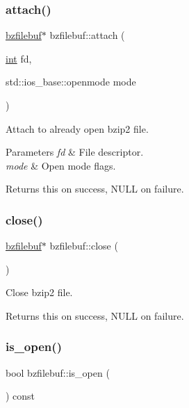 \subsubsection{\texorpdfstring{attach()}{attach()}}
{\footnotesize\ttfamily \hyperlink{classbzfilebuf}{bzfilebuf}$\ast$ bzfilebuf\+::attach (\begin{DoxyParamCaption}\item[{\hyperlink{lp__lib_8h_adeb9ec6400320e4923ac9d836d509ddb}{int}}]{fd,  }\item[{std\+::ios\+\_\+base\+::openmode}]{mode }\end{DoxyParamCaption})}



Attach to already open bzip2 file. 


\begin{DoxyParams}{Parameters}
{\em fd} & File descriptor. \\
\hline
{\em mode} & Open mode flags. \\
\hline
\end{DoxyParams}
\begin{DoxyReturn}{Returns}
{\ttfamily this} on success, N\+U\+LL on failure. 
\end{DoxyReturn}
\mbox{\label{classbzfilebuf_a07ccdb23bcdb2f4cb4d554840427174a}} 
\subsubsection{\texorpdfstring{close()}{close()}}
{\footnotesize\ttfamily \hyperlink{classbzfilebuf}{bzfilebuf}$\ast$ bzfilebuf\+::close (\begin{DoxyParamCaption}{ }\end{DoxyParamCaption})}



Close bzip2 file. 

\begin{DoxyReturn}{Returns}
{\ttfamily this} on success, N\+U\+LL on failure. 
\end{DoxyReturn}
\mbox{\label{classbzfilebuf_adfaac599c0c4e62ad8a3f55080f135e5}} 
\subsubsection{\texorpdfstring{is\+\_\+open()}{is\_open()}}
{\footnotesize\ttfamily bool bzfilebuf\+::is\+\_\+open (\begin{DoxyParamCaption}{ }\end{DoxyParamCaption}) const\hspace{0.3cm}{\ttfamily [inline]}}



